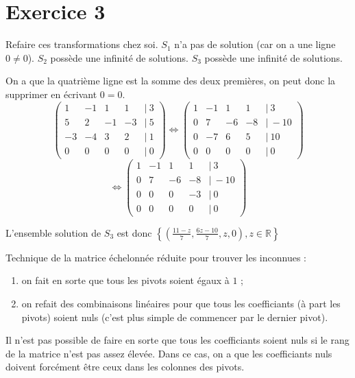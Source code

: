 \documentclass[a4paper, titlepage]{article}
\begin{document}
	\section*{Exercice 3}
	Refaire ces transformations chez soi. $S_1$ n'a pas de solution (car on a une ligne $0\neq 0$). $S_2$ possède une infinité de solutions. $S_3$ possède une infinité de solutions.

	On a que la quatrième ligne est la somme des deux premières, on peut donc la supprimer en écrivant $0=0$.
			$$ \begin{pmatrix} 1&-1&1&1&|~3\\ 5&2&-1&-3&|~5\\ -3&-4&3&2&|~1\\ 0&0&0&0&|~0 \end{pmatrix} \iff \begin{pmatrix} 1&-1&1&1&|~3\\ 0&7&-6&-8&|~-10\\ 0&-7&6&5&|~10\\ 0&0&0&0&|~0 \end{pmatrix}  $$
			$$ \iff\begin{pmatrix} 1&-1&1&1&|~3\\ 0&7&-6&-8&|~-10\\ 0&0&0&-3&|~0\\ 0&0&0&0&|~0 \end{pmatrix}$$

	L'ensemble solution de $S_3$ est donc $\left\{ \left( \frac{11-z}{7},\frac{6z-10}{7}, z, 0 \right), z\in\mathbb{R} \right\} $
	
	Technique de la matrice échelonnée réduite pour trouver les inconnues :
	\begin{enumerate}
		\item on fait en sorte que tous les pivots soient égaux à $1$ ;
		\item on refait des combinaisons linéaires pour que tous les coefficiants (à part les pivots) soient nuls (c'est plus simple de commencer par le dernier pivot).
	\end{enumerate}
	Il n'est pas possible de faire en sorte que tous les coefficiants soient nuls si le rang de la matrice n'est pas assez élevée. Dans ce cas, on a que les coefficiants nuls doivent forcément être ceux dans les colonnes des pivots.
\end{document}
